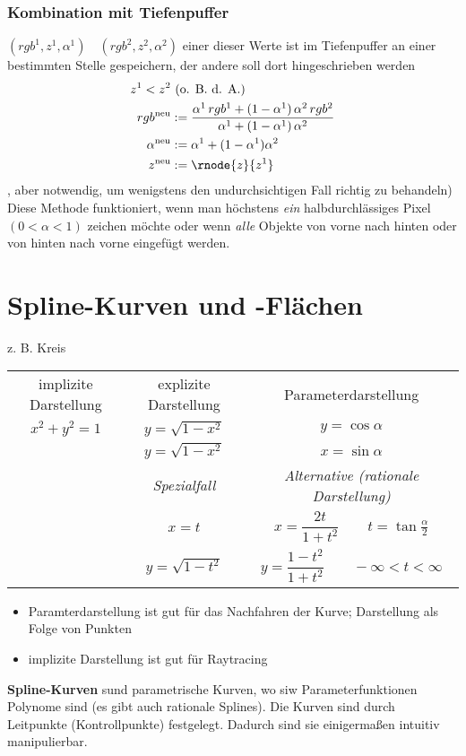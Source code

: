 \subsection{Kombination mit Tiefenpuffer}
$(rgb^1, z^1, \alpha^1)\quad(rgb^2, z^2, \alpha^2)$ einer dieser Werte ist im Tiefenpuffer an einer bestimmten Stelle gespeichern,
	der andere soll dort hingeschrieben werden
\begin{align*}
 z^1 < z^2 &\ \text{(o. B. d. A.)}\\
 rgb^\mathrm{neu} &:= \frac{\alpha^1\,rgb^1 + (1-\alpha^1)\,\alpha^2\,rgb^2}{\alpha^1+(1-\alpha^1)\,\alpha^2}\\
 \alpha^\mathrm{neu} &:= \alpha^1 + (1-\alpha^1) \alpha^2\\
 z^\mathrm{neu} &:= \rnode{z}{z^1} 
\end{align*}
, aber notwendig, um wenigstens den undurchsichtigen Fall richtig zu behandeln)
\\[1em]
Diese Methode funktioniert, wenn man höchstens \emph{ein} halbdurchlässiges Pixel $(0 < \alpha < 1)$ zeichen möchte
oder wenn \emph{alle} Objekte von vorne nach hinten oder von hinten nach vorne eingefügt werden.

\chapter{Spline-Kurven und -Flächen}
\begin{center}
\end{center}
z. B. Kreis
\begin{center}
\begin{tabular}{ccc}
implizite Darstellung & explizite Darstellung & Parameterdarstellung \\
$x^2 + y^2 = 1$		& $y = \sqrt{1 - x^2}$	& $y = \cos \alpha$  \\
			& $y = \sqrt{1 - x^2}$	& $x = \sin \alpha$ \\
		 \hline
			& \emph{Spezialfall}	& \emph{Alternative (rationale Darstellung)} \\
			& $x = t$		& $x = \dfrac{2t}{1+t^2} \qquad t = \tan \frac{\alpha}{2}$\\
			& $y = \sqrt{1 - t^2}$	& $y = \dfrac{1-t^2}{1+t^2} \qquad -\infty < t < \infty$
\end{tabular}
\end{center}
\begin{center}
\end{center}
\begin{itemize}
 \item Paramterdarstellung ist gut für das Nachfahren der Kurve; Darstellung als Folge von Punkten
 \item implizite Darstellung ist gut für Raytracing
\end{itemize}
\Defi	\textbf{Spline-Kurven} sund parametrische Kurven, wo siw Parameterfunktionen Polynome sind (es gibt auch
	rationale Splines). Die Kurven sind durch Leitpunkte (Kontrollpunkte) festgelegt. Dadurch sind sie einigermaßen
	intuitiv manipulierbar.

